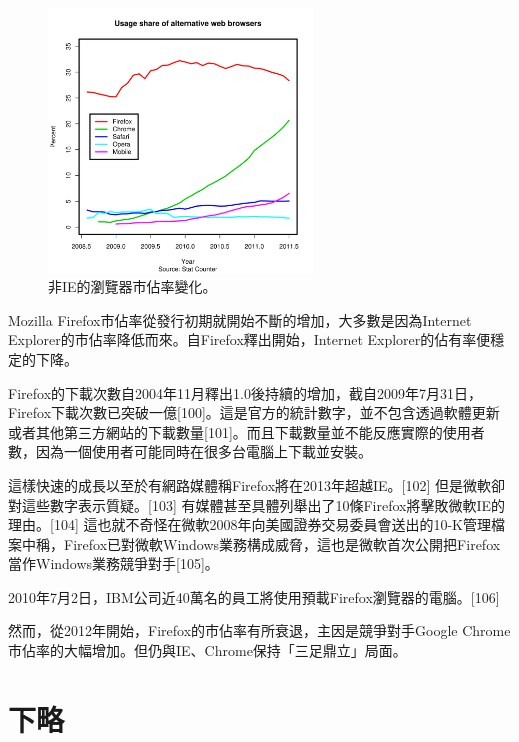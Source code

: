 \documentclass[12pt, a4paper]{article}
\begin{document}
\begin{figure}
  \begin{center}
    \includegraphics[width=70mm]{Usage}
  \end{center}
  \caption{非IE的瀏覽器市佔率變化。}
\end{figure}

Mozilla Firefox市佔率從發行初期就開始不斷的增加，大多數是因為Internet Explorer的市佔率降低而來。自Firefox釋出開始，Internet Explorer的佔有率便穩定的下降。

Firefox的下載次數自2004年11月釋出1.0後持續的增加，截自2009年7月31日，Firefox下載次數已突破一億[100]。這是官方的統計數字，並不包含透過軟體更新或者其他第三方網站的下載數量[101]。而且下載數量並不能反應實際的使用者數，因為一個使用者可能同時在很多台電腦上下載並安裝。

這樣快速的成長以至於有網路媒體稱Firefox將在2013年超越IE。[102] 但是微軟卻對這些數字表示質疑。[103] 有媒體甚至具體列舉出了10條Firefox將擊敗微軟IE的理由。[104] 這也就不奇怪在微軟2008年向美國證券交易委員會送出的10-K管理檔案中稱，Firefox已對微軟Windows業務構成威脅，這也是微軟首次公開把Firefox當作Windows業務競爭對手[105]。

2010年7月2日，IBM公司近40萬名的員工將使用預載Firefox瀏覽器的電腦。[106]

然而，從2012年開始，Firefox的市佔率有所衰退，主因是競爭對手Google Chrome市佔率的大幅增加。但仍與IE、Chrome保持「三足鼎立」局面。

\section{下略}
\end{document}

